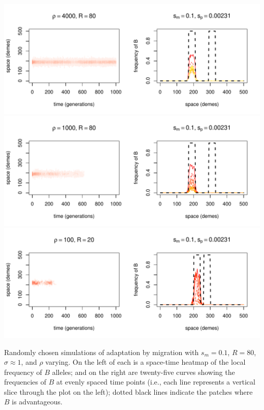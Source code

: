 \documentclass{article}
\begin{document}
\begin{sfigure}
  \begin{center}
    \includegraphics{example-migration-sims/89826-r1-501-sb0_01-sm-0_1-N4000-pophistory-run}
    \includegraphics{example-migration-sims/76178-r1-501-sb0_01-sm-0_1-N1000-pophistory-run}
    \includegraphics{example-migration-sims/95095-r1-501-sb0_01-sm-0_1-N100-pophistory-run}
  \end{center}
  \caption{
    Randomly chosen simulations of adaptation by migration
    with $s_m=0.1$, $R=80$, $\sigma\approx 1$, and $\rho$ varying.
    On the left of each is a space-time heatmap of the local frequency of $B$ alleles;
    and on the right are twenty-five curves showing the frequencies of $B$ at evenly spaced time points
    (i.e., each line represents a vertical slice through the plot on the left);
    dotted black lines indicate the patches where $B$ is advantageous.
  } \label{sfig:sims_5}
\end{sfigure}
\end{document}
